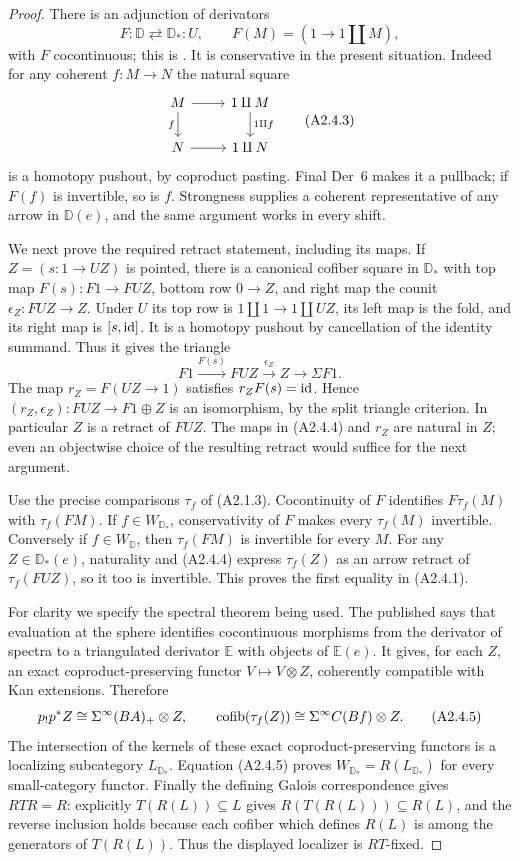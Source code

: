 \begin{proof}
There is an adjunction of derivators
\[
 F:\mathbb D\rightleftarrows\mathbb D_*:U,
 \qquad F(M)=(1\longrightarrow1\amalg M),
 \tag{A2.4.2}
\]
with $F$ cocontinuous; this is \cite[Lemma~4.15]{A2CisinskiKan}.
It is conservative in the present situation. Indeed for any coherent
$f:M\to N$ the natural square
\[
 \begin{tikzcd}
 M\ar[r]\ar[d,"f"']&1\amalg M\ar[d,"1\amalg f"]\\
 N\ar[r]&1\amalg N
 \end{tikzcd}
 \tag{A2.4.3}
\]
is a homotopy pushout, by coproduct pasting. Final Der~6 makes it a pullback;
if $F(f)$ is invertible, so is $f$. Strongness supplies a coherent representative
of any arrow in $\mathbb D(e)$, and the same argument works in every shift.

We next prove the required retract statement, including its maps. If
$Z=(s:1\to UZ)$ is pointed, there is a canonical cofiber square in
$\mathbb D_*$ with top map $F(s):F1\to FUZ$, bottom row $0\to Z$, and
right map the counit $\epsilon_Z:FUZ\to Z$. Under $U$ its top row is
$1\amalg1\to1\amalg UZ$, its left map is the fold, and its right map
is $[s,\operatorname{id}]$. It is a homotopy pushout by cancellation of the identity
summand. Thus it gives the triangle
\[
 F1\xrightarrow{F(s)}FUZ\xrightarrow{\epsilon_Z}Z\longrightarrow\Sigma F1.
 \tag{A2.4.4}
\]
The map $r_Z=F(UZ\to1)$ satisfies $r_ZF(s)=\operatorname{id}$. Hence
$(r_Z,\epsilon_Z):FUZ\to F1\oplus Z$ is an isomorphism, by the split
triangle criterion. In particular $Z$ is a retract of $FUZ$. The maps in
(A2.4.4) and $r_Z$ are natural in $Z$; even an objectwise choice of the
resulting retract would suffice for the next argument.

Use the precise comparisons $\tau_f$ of (A2.1.3). Cocontinuity of $F$
identifies $F\tau_f(M)$ with $\tau_f(FM)$. If $f\in W_{\mathbb D_*}$,
conservativity of $F$ makes every $\tau_f(M)$ invertible. Conversely if
$f\in W_{\mathbb D}$, then $\tau_f(FM)$ is invertible for every $M$.
For any $Z\in\mathbb D_*(e)$, naturality and (A2.4.4) express
$\tau_f(Z)$ as an arrow retract of $\tau_f(FUZ)$, so it too is invertible.
This proves the first equality in (A2.4.1).

For clarity we specify the spectral theorem being used. The published
\cite[Theorem~A.11, p.~1317]{A2CisinskiTabuada} says that evaluation at the
sphere identifies cocontinuous morphisms from the derivator of spectra to
a triangulated derivator $\mathbb E$ with objects of $\mathbb E(e)$.
It gives, for each $Z$, an exact coproduct-preserving functor
$V\mapsto V\otimes Z$, coherently compatible with Kan extensions. Therefore
\[
 p_!p^*Z\cong\Sigma^\infty(BA)_+\otimes Z,\qquad
 \operatorname{cofib}(\tau_f(Z))\cong\Sigma^\infty C(Bf)\otimes Z.
 \tag{A2.4.5}
\]
The intersection of the kernels of these exact coproduct-preserving functors
is a localizing subcategory $L_{\mathbb D_*}$. Equation (A2.4.5) proves
$W_{\mathbb D_*}=R(L_{\mathbb D_*})$ for every small-category functor.
Finally the defining Galois correspondence gives $RTR=R$: explicitly
$T(R(L))\subseteq L$ gives $R(T(R(L)))\subseteq R(L)$, and the reverse
inclusion holds because each cofiber which defines $R(L)$ is among the
generators of $T(R(L))$. Thus the displayed localizer is $RT$-fixed.
\end{proof}

